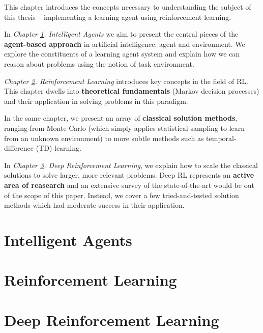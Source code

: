 This chapter introduces the concepts necessary to understanding the subject of this thesis -- implementing a learning agent using reinforcement learning.

In \emph{Chapter \ref{agents-intro}. Intelligent Agents} we aim to present the central pieces of the \textbf{agent-based approach} in artificial intelligence: agent and environment.
We explore the constituents of a learning agent system and explain how we can reason about problems using the notion of task environment.

\emph{Chapter \ref{reinforcement-learning}. Reinforcement Learning} introduces key concepts in the field of RL. This chapter dwells into \textbf{theoretical fundamentals} (Markov decision processes) and their application in solving problems in this paradigm.

In the same chapter, we present an array of \textbf{classical solution methods}, ranging from Monte Carlo (which simply applies statistical sampling to learn from an unknown environment) to more subtle methods such as temporal-difference (TD) learning.

In \emph{Chapter \ref{deep-rl}. Deep Reinforcement Learning}, we explain how to scale the classical solutions to solve larger, more relevant problems.
Deep RL represents an \textbf{active area of reasearch} and an extensive survey of the state-of-the-art would be out of the scope of this paper.
Instead, we cover a few tried-and-tested solution methods which had moderate success in their application.

\clearpage

\section{Intelligent Agents} \label{agents-intro}


\section{Reinforcement Learning} \label{reinforcement-learning}


\section{Deep Reinforcement Learning} \label{deep-rl}
